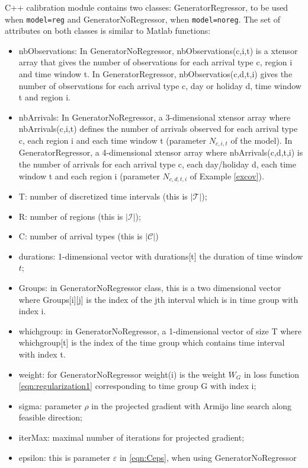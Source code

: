 \documentclass[article]{jss}
\begin{document}
{C++ calibration module contains two classes: GeneratorRegressor, to be used when {\tt{model=reg}} and GeneratorNoRegressor, when {\tt{model=noreg}}. The set of attributes on both classes is similar to Matlab functions:
\begin{itemize}
    \item nbObservations: In GeneratorNoRegressor, nbObservations(c,i,t) is a xtensor array that gives the number of observations for each arrival type c, region i and time window t. In GeneratorRegressor, nbObservatios(c,d,t,i) gives the number of observations for each arrival type c, day or holiday d, time window t and region i.
    \item nbArrivals: In GeneratorNoRegressor, a 3-dimensional xtensor array where nbArrivals(c,i,t) defines the number of arrivals observed for each arrival type c, each region i and each time window t (parameter \(N_{c,i,t}\) of the model). In GeneratorRegressor, a 4-dimensional xtensor array where nbArrivals(c,d,t,i) is the number of arrivals for each arrival type c, each day/holiday d, each time window t and each region i (parameter \(N_{c,d,t,i}\) of Example \ref{excov}).
    \item T: number of discretized time intervals (this is $|\mathcal{T}|$);
    \item R: number of regions (this is $|\mathcal{I}|$);
    \item C: number of arrival types (this is $|\mathcal{C}|$)
    \item durations: 1-dimensional vector with durations[t] the duration of time window $t$;
    \item Groups: in GeneratorNoRegressor class, this is a two dimensional vector where Groups[i][j] is the index of the jth interval which is in time group with index i. 
    \item whichgroup: in GeneratorNoRegressor, a 1-dimensional vector of size T where whichgroup[t] is the index of the time group which contains time interval with index t. 
    \item weight: for GeneratorNoRegressor
    weight(i) is the weight $W_G$ in loss function \eqref{eqn:regularization1} corresponding to time group G with index i;
    \item sigma: parameter \(\rho\) in the projected gradient with Armijo line search along feasible direction;
    \item iterMax: maximal number of iterations for projected gradient;
    \item epsilon:  this is parameter $\varepsilon$ in \eqref{eqn:Ceps}, when using GeneratorNoRegressor

\end{itemize}}
\end{document}
